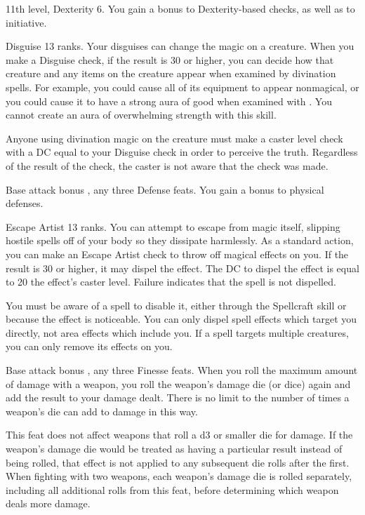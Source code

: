 \featpre 11th level, Dexterity 6.
\featben You gain a  bonus to Dexterity-based checks, as well as to initiative.

\featpre Disguise 13 ranks.
\featben Your disguises can change the magic on a creature. When you make a Disguise check, if the result is 30 or higher, you can decide how that creature and any items on the creature appear when examined by divination spells. For example, you could cause all of its equipment to appear nonmagical, or you could cause it to have a strong aura of good when examined with . You cannot create an aura of overwhelming strength with this skill.

Anyone using divination magic on the creature must make a caster level check with a DC equal to your Disguise check in order to perceive the truth. Regardless of the result of the check, the caster is not aware that the check was made.

\featpre Base attack bonus , any three Defense feats.
\featben You gain a  bonus to physical defenses.

\featpre Escape Artist 13 ranks.
\featben You can attempt to escape from magic itself, slipping hostile spells off of your body so they dissipate harmlessly. As a standard action, you can make an Escape Artist check to throw off magical effects on you. If the result is 30 or higher, it may dispel the effect. The DC to dispel the effect is equal to 20 \add the effect's caster level. Failure indicates that the spell is not dispelled.

You must be aware of a spell to disable it, either through the Spellcraft skill or because the effect is noticeable. You can only dispel spell effects which target you directly, not area effects which include you. If a spell targets multiple creatures, you can only remove its effects on you.

\featpre Base attack bonus , any three Finesse feats.
\featben When you roll the maximum amount of damage with a weapon, you roll the weapon's damage die (or dice) again and add the result to your damage dealt. There is no limit to the number of times a weapon's die can add to damage in this way.

This feat does not affect weapons that roll a d3 or smaller die for damage. If the weapon's damage die would be treated as having a particular result instead of being rolled, that effect is not applied to any subsequent die rolls after the first. When fighting with two weapons, each weapon's damage die is rolled separately, including all additional rolls from this feat, before determining which weapon deals more damage.

